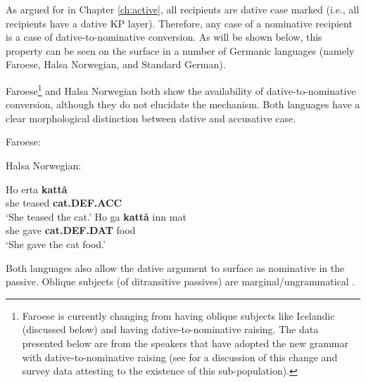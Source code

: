 As argued for in Chapter \ref{ch:active}, all recipients are dative case marked (i.e., all recipients have a dative KP layer). Therefore, any case of a nominative recipient is a case of dative-to-nominative conversion. As will be shown below, this property can be seen on the surface in a number of Germanic languages (namely Faroese, Halsa Norwegian, and Standard German). 

Faroese\footnote{Faroese is currently changing from having oblique subjects like Icelandic (discussed below) and having dative-to-nominative raising. The data presented below are from the speakers that have adopted the new grammar with dative-to-nominative raising (see \cite{Eyorsson.2012} for a discussion of this change and survey data attesting to the existence of this sub-population).} and Halsa Norwegian both show the availability of dative-to-nominative conversion, although they do not elucidate the mechanism. Both languages have a clear morphological distinction between dative and accusative case.

\begin{exe}
	\ex Faroese:
		\begin{xlist}
		\end{xlist}
	\ex Halsa Norwegian:
	\begin{xlist}
		\ex \gll Ho erta \textbf{katt\aa} \\
		she teased \textbf{cat.DEF.ACC} \\
			\trans `She teased the cat.'
			\ex \gll Ho ga \textbf{katt\aa} inn mat \\
			she gave \textbf{cat.DEF.DAT} food \\
			\trans `She gave the cat food.'
	\end{xlist}
\end{exe}

Both languages also allow the dative argument to surface as nominative in the passive. Oblique subjects (of ditransitive passives) are marginal/ungrammatical \citep{Eyorsson.2012}.

